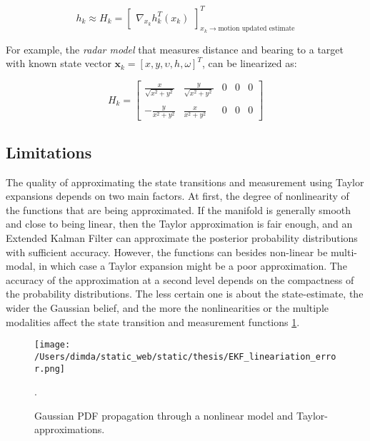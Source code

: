 \begin{equation}
h_{k} \approx H_{k} =
\begin{bmatrix}
\nabla_{x_{k}} h_{k}^{T}(x_{k})
\end{bmatrix}_{x_{k} \rightarrow\text{motion updated estimate}}^{T}
\end{equation}

For example, the \emph{radar model} that measures distance and bearing  to a target with known state vector $\mathbf{x}_k = [x,y,\upsilon,h,\omega]^T$, can be linearized as:


\begin{equation}
H_k =
\begin{bmatrix}
\frac{x}{\sqrt{x^2+y^2}} &\frac{y}{\sqrt{x^2+y^2}} &0 &0 &0 \\\\
-\frac{y}{x^2+y^2} &\frac{x}{x^2+y^2} &0 &0 &0
\end{bmatrix}
\end{equation}

\subsection{Limitations}

The quality of approximating the state transitions and measurement using Taylor expansions depends on two main factors. At first, the degree of nonlinearity of the functions that are being approximated. If the manifold is generally smooth and close to being linear, then the Taylor approximation is fair enough, and an Extended Kalman Filter can approximate the posterior probability distributions with sufficient accuracy. However, the functions can besides non-linear be multi-modal, in which case a Taylor expansion might be a poor approximation. The accuracy of the approximation at a second level depends on the compactness of the probability distributions. The less certain one is about the state-estimate, the wider the Gaussian belief, and the more the nonlinearities or the multiple modalities affect the state transition and measurement functions \cref{fig:taylor_approximation}.

\begin{figure}[H]
	\centering
	\texttt{[image: /Users/dimda/static\_web/static/thesis/EKF\_lineariation\_error.png]}
	\caption{Gaussian PDF propagation through a nonlinear model and Taylor-approximations\cite{Thrun2005}.}.
	\label{fig:taylor_approximation}
\end{figure}

